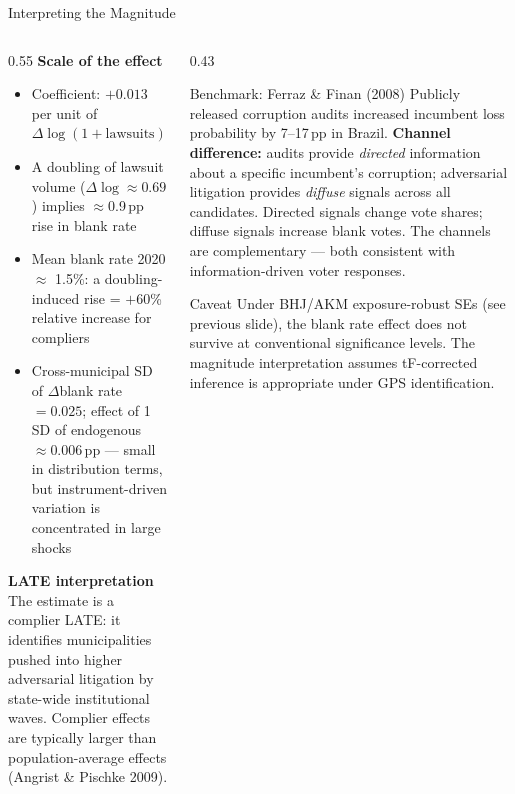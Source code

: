 \documentclass[aspectratio=169,10pt]{beamer}
\begin{document}
\begin{frame}{Interpreting the Magnitude}
\begin{columns}[T]
\begin{column}{0.55\textwidth}
\textbf{Scale of the effect}
\begin{itemize}
  \item Coefficient: $+0.013$ per unit of $\Delta\log(1+\text{lawsuits})$
  \item A doubling of lawsuit volume ($\Delta\log\approx0.69$) implies $\approx$0.9\,pp rise in blank rate
  \item Mean blank rate 2020 $\approx$ 1.5\%: a doubling-induced rise = $+$60\% relative increase for compliers
  \item Cross-municipal SD of $\Delta$blank rate $= 0.025$; effect of 1 SD of endogenous $\approx 0.006$\,pp --- small in distribution terms, but instrument-driven variation is concentrated in large shocks
\end{itemize}
\bigskip
\textbf{LATE interpretation}\\
The estimate is a complier LATE: it identifies municipalities pushed into higher adversarial litigation by state-wide institutional waves. Complier effects are typically larger than population-average effects (Angrist \& Pischke 2009).
\end{column}
\begin{column}{0.43\textwidth}
\begin{block}{Benchmark: Ferraz \& Finan (2008)}
  \footnotesize
  Publicly released corruption audits increased incumbent loss probability by 7--17\,pp in Brazil. \textbf{Channel difference:} audits provide \emph{directed} information about a specific incumbent's corruption; adversarial litigation provides \emph{diffuse} signals across all candidates. Directed signals change vote shares; diffuse signals increase blank votes. The channels are complementary --- both consistent with information-driven voter responses.
\end{block}
\medskip
\begin{alertblock}{Caveat}
  \footnotesize
  Under BHJ/AKM exposure-robust SEs (see previous slide), the blank rate effect does not survive at conventional significance levels. The magnitude interpretation assumes tF-corrected inference is appropriate under GPS identification.
\end{alertblock}
\end{column}
\end{columns}
\end{frame}
\end{document}
